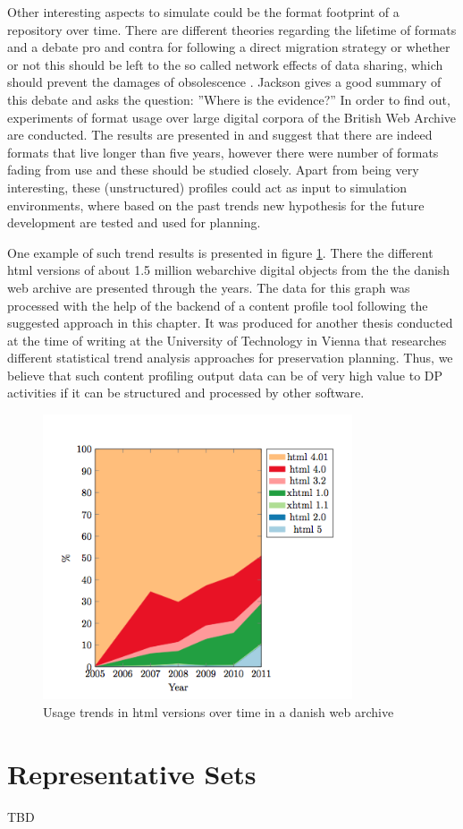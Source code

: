 Other interesting aspects to simulate could be the format footprint of a repository over time. There are different theories regarding the lifetime of formats and a debate pro and contra for following a direct migration strategy or whether or not this should be left to the so called network effects of data sharing, which should prevent the damages of obsolescence \cite{Rosenthal:1January2010:0737-8831:195}. Jackson gives a good summary of this debate and asks the question: ''Where is the evidence?'' In order to find out, experiments of format usage over large digital corpora of the British Web Archive are conducted. The results are presented in \cite{journals/corr/abs-1210-1714} and suggest that there are indeed formats that live longer than five years, however there were number of formats fading from use and these should be studied closely. Apart from being very interesting, these (unstructured) profiles could act as input to simulation environments, where based on the past trends new hypothesis for the future development are tested and used for planning.

One example of such trend results is presented in figure \ref{fig:trends_html}. There the different html versions of about 1.5 million webarchive digital objects from the the danish web archive are presented through the years. The data for this graph was processed with the help of the backend of a content profile tool following the suggested approach in this chapter. It was produced for another thesis conducted at the time of writing at the University of Technology in Vienna that researches different statistical trend analysis approaches for preservation planning. Thus, we believe that such content profiling output data can be of very high value to DP activities if it can be structured and processed by other software.


\begin{figure}[b]
\begin{center}
\includegraphics[width=3.6in]{figures/contentprofiling/trends_html.png}
\caption{Usage trends in html versions over time in a danish web archive}
\label{fig:trends_html}
\end{center}
\end{figure}

\section{Representative Sets}
\label{sec:representative_sets}
TBD
